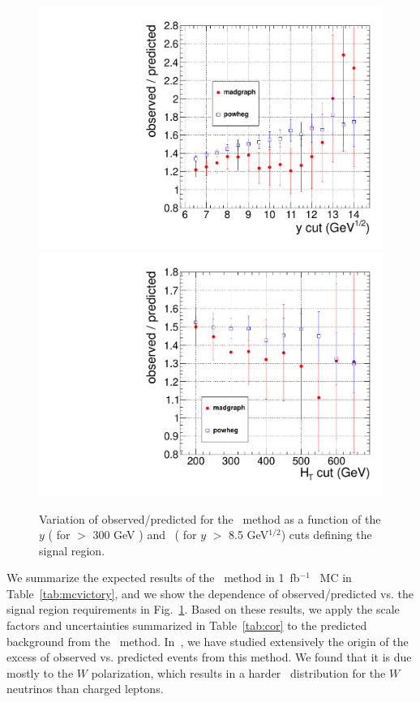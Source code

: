 \begin{figure}[hbt]
\begin{center}
\includegraphics[width=0.48\linewidth]{plots/victory_yvary.pdf}
\includegraphics[width=0.48\linewidth]{plots/victory_htvary.pdf}
\caption{\label{fig:victory}\protect Variation of observed/predicted
for the \ptll\ method as a function of the $y$ ( for \Ht $>$ 300 GeV ) and 
\Ht\ ( for $y$ $>$ 8.5 GeV$^{1/2}$) cuts defining the signal region.}
\end{center}
\end{figure}

We summarize the expected results of the \ptll\ method in 1~fb$^{-1}$ \ttbar\ MC in Table~\ref{tab:mcvictory},
and we show the dependence of observed/predicted vs. the signal region requirements in Fig.~\ref{fig:victory}.
Based on these results, we apply the scale factors and uncertainties summarized in Table~\ref{tab:cor} to the
predicted background from the \ptll\ method. In~\cite{ref:osnote}, we have studied extensively the origin
of the excess of observed vs. predicted events from this method. We found that it is due mostly to 
the $W$ polarization, which results in a harder \pt\ distribution for the $W$ neutrinos than charged leptons.


